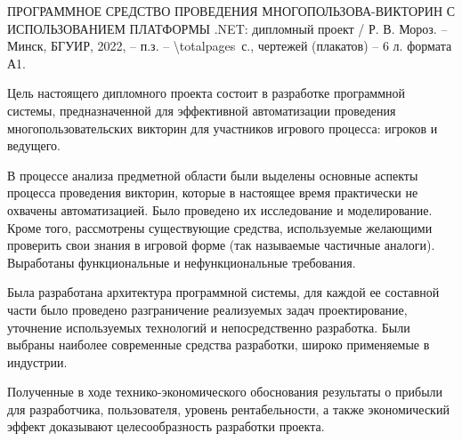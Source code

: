 \thispagestyle{empty}


\noindent
ПРОГРАММНОЕ СРЕДСТВО ПРОВЕДЕНИЯ МНОГОПОЛЬЗОВА- ВИКТОРИН С ИСПОЛЬЗОВАНИЕМ ПЛАТФОРМЫ .NET: дипломный проект / Р. В. Мороз. -- Минск, БГУИР,
2022, -- п.з. -- \num{\totalpages}~с., чертежей (плакатов) -- 6 л. формата А1.
\newline

Цель настоящего дипломного проекта состоит в разработке программной системы, предназначенной для эффективной автоматизации проведения 
многопользовательских викторин для участников игрового процесса: игроков и ведущего. 

В процессе анализа предметной области были выделены основные аспекты процесса проведения викторин, которые в настоящее время практически не охвачены автоматизацией. 
Было проведено их исследование и моделирование. Кроме того, рассмотрены существующие средства, используемые желающими проверить свои знания в игровой форме (так называемые частичные аналоги). 
Выработаны функциональные и нефункциональные требования.

Была разработана архитектура программной системы, для каждой ее составной части было проведено разграничение реализуемых задач проектирование, 
уточнение используемых технологий и непосредственно разработка. Были выбраны наиболее современные средства разработки, широко применяемые в индустрии. 

Полученные в ходе технико-экономического обоснования результаты о прибыли для разработчика, пользователя, уровень рентабельности, а также экономический эффект доказывают целесообразность разработки проекта.